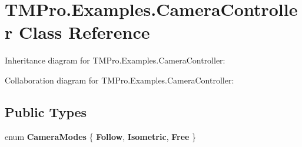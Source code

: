 \hypertarget{classTMPro_1_1Examples_1_1CameraController}{}\section{T\+M\+Pro.\+Examples.\+Camera\+Controller Class Reference}
\label{classTMPro_1_1Examples_1_1CameraController}


Inheritance diagram for T\+M\+Pro.\+Examples.\+Camera\+Controller\+:


Collaboration diagram for T\+M\+Pro.\+Examples.\+Camera\+Controller\+:
\subsection*{Public Types}
\begin{DoxyCompactItemize}
\item 
\mbox{\label{classTMPro_1_1Examples_1_1CameraController_a8180251e92d62266c8a026f0b77452ce}} 
enum {\bfseries Camera\+Modes} \{ {\bfseries Follow}, 
{\bfseries Isometric}, 
{\bfseries Free}
 \}
\end{DoxyCompactItemize}
